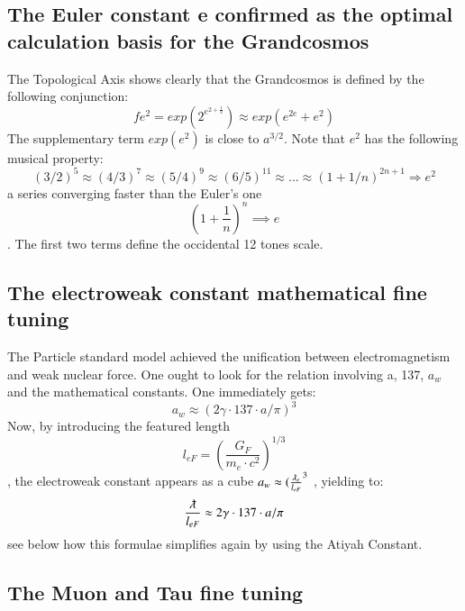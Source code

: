 \documentclass[twoside,draft]{article}
\begin{document}
\begin{sloppypar}
{\subsection {The Euler constant e confirmed as the optimal calculation basis for the Grandcosmos}

The Topological Axis shows clearly that the Grandcosmos is defined by the following
conjunction:
\begin{equation}
f{e^{2}} = exp(2^{e^{2+\frac{1}{2}}}) \approx exp(e^{2e}+e^{2})
\end{equation}
The supplementary term $exp(e^{2})$ is close to $a^{3/2}$. Note that $e^{2}$ has the following musical property:
\begin{equation}
(3/2)^{5} \approx (4/3)^{7} \approx (5/4)^{9} \approx (6/5)^{11} \approx ... \approx (1+1/n)^{2n+1} \Rightarrow e^{2}
\end{equation}
a series converging faster than the Euler's one $$(1+\frac{1}{n})^{n} \implies e$$. The first two terms define
the occidental 12 tones scale.

\subsection {The electroweak constant mathematical fine tuning}

The Particle standard model achieved the unification between electromagnetism and weak
nuclear force. One ought to look for the relation involving a, 137, $a_{w}$ and the mathematical constants. One
immediately gets:
\begin{equation}
a_{w} \approx (2\gamma \cdot 137 \cdot a/\pi)^{3}
\end{equation}
Now, by introducing the featured length $$l_{eF} = (\frac{G_{F}}{m_{e} \cdot c^{2}})^{1/3}$$ , the electroweak constant appears as
a cube $a_{w} \approx (\frac{\lambdabar_{e}}{l_{eF}}^{3}$ , yielding to:
\begin{equation}
\frac{\lambdabar}{l_{eF}} \approx 2\gamma \cdot 137 \cdot a/\pi
\end{equation}
see below how this formulae simplifies again by using the Atiyah Constant.

\subsection {The Muon and Tau fine tuning}

}
\end{sloppypar}
\end{document}

